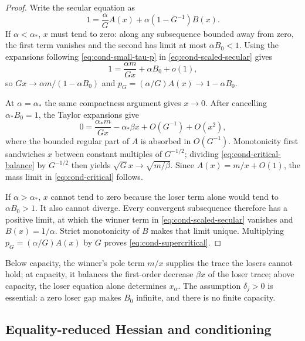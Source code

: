\begin{proof}
Write the secular equation as
\begin{equation}
 1=\frac{\alpha}{G}A(x)+\alpha(1-G^{-1})B(x).
 \label{eq:cond-scaled-secular}
\end{equation}
If $\alpha<\alpha_*$, $x$ must tend to zero: along any subsequence bounded
away from zero, the first term vanishes and the second has limit at most
$\alpha B_0<1$.  Using the expansions following
\eqref{eq:cond-small-tau-p} in \eqref{eq:cond-scaled-secular} gives
\[
 1=\frac{\alpha m}{Gx}+\alpha B_0+o(1),
\]
so $Gx\to\alpha m/(1-\alpha B_0)$ and
$p_G=(\alpha/G)A(x)\to1-\alpha B_0$.

At $\alpha=\alpha_*$ the same compactness argument gives $x\to0$.
After cancelling $\alpha_*B_0=1$, the Taylor expansions give
\begin{equation}
 0=\frac{\alpha_*m}{Gx}-\alpha_*\beta x
       +O(G^{-1})+O(x^2),
 \label{eq:cond-critical-balance}
\end{equation}
where the bounded regular part of $A$ is absorbed in $O(G^{-1})$.
Monotonicity first sandwiches $x$ between constant multiples of
$G^{-1/2}$; dividing \eqref{eq:cond-critical-balance} by $G^{-1/2}$ then
yields $\sqrt Gx\to\sqrt{m/\beta}$.  Since
$A(x)=m/x+O(1)$, the mass limit in \eqref{eq:cond-critical} follows.

If $\alpha>\alpha_*$, $x$ cannot tend to zero because the loser term alone
would tend to $\alpha B_0>1$.  It also cannot diverge.  Every convergent
subsequence therefore has a positive limit, at which the winner term in
\eqref{eq:cond-scaled-secular} vanishes and $B(x)=1/\alpha$.  Strict
monotonicity of $B$ makes that limit unique.  Multiplying
$p_G=(\alpha/G)A(x)$ by $G$ proves \eqref{eq:cond-supercritical}.
\end{proof}

Below capacity, the winner's pole term $m/x$ supplies the trace the losers
cannot hold; at capacity, it balances the first-order decrease $\beta x$ of
the loser trace; above capacity, the loser equation alone determines
$x_\alpha$.  The assumption $\delta_j>0$ is essential: a zero
loser gap makes $B_0$ infinite, and there is no finite capacity.

\subsection{Equality-reduced Hessian and conditioning}
\label{sec:condensation-conditioning}

